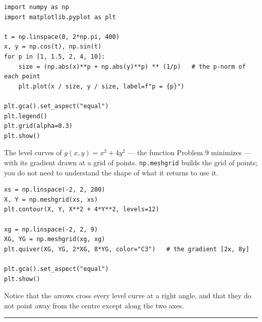 \documentclass[11pt]{article}
\newcounter{prob}
\begin{document}
\begin{lstlisting}
import numpy as np
import matplotlib.pyplot as plt

t = np.linspace(0, 2*np.pi, 400)
x, y = np.cos(t), np.sin(t)
for p in [1, 1.5, 2, 4, 10]:
    size = (np.abs(x)**p + np.abs(y)**p) ** (1/p)   # the p-norm of each point
    plt.plot(x / size, y / size, label=f"p = {p}")

plt.gca().set_aspect("equal")
plt.legend()
plt.grid(alpha=0.3)
plt.show()
\end{lstlisting}

\noindent The level curves of $g(x,y)=x^{2}+4y^{2}$ --- the function Problem 9
minimizes --- with its gradient drawn at a grid of points. \texttt{np.meshgrid}
builds the grid of points; you do not need to understand the shape of what it
returns to use it.

\begin{lstlisting}
xs = np.linspace(-2, 2, 200)
X, Y = np.meshgrid(xs, xs)
plt.contour(X, Y, X**2 + 4*Y**2, levels=12)

xg = np.linspace(-2, 2, 9)
XG, YG = np.meshgrid(xg, xg)
plt.quiver(XG, YG, 2*XG, 8*YG, color="C3")   # the gradient [2x, 8y]

plt.gca().set_aspect("equal")
plt.show()
\end{lstlisting}

\noindent Notice that the arrows cross every level curve at a right angle, and
that they do not point away from the centre except along the two axes.

\bigskip
\noindent\rule{\textwidth}{0.4pt}

\smallskip
{}
\end{document}
